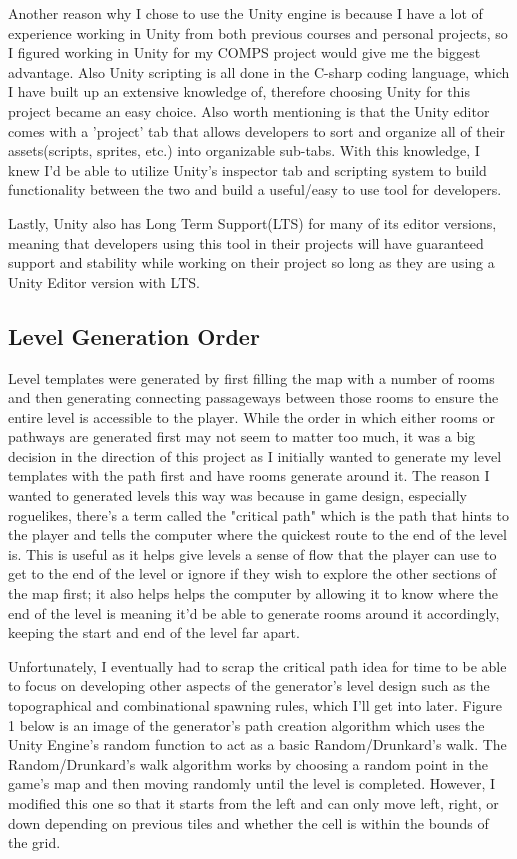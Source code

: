 \documentclass[10pt,twocolumn]{article}
\begin{document}
Another reason why I chose to use the Unity engine is because I have a lot of experience working in Unity from both previous courses and personal projects, so I figured working in Unity for my COMPS project would give me the biggest advantage. Also Unity scripting is all done in the C-sharp coding language, which I have built up an extensive knowledge of, therefore choosing Unity for this project became an easy choice. Also worth mentioning is that the Unity editor comes with a 'project' tab that allows developers to sort and organize all of their assets(scripts, sprites, etc.) into organizable sub-tabs. With this knowledge, I knew I'd be able to utilize Unity's inspector tab and scripting system to build functionality between the two and build a useful/easy to use tool for developers. 

Lastly, Unity also has Long Term Support(LTS) for many of its editor versions, meaning that developers using this tool in their projects will have guaranteed support and stability while working on their project so long as they are using a Unity Editor version with LTS. 

\subsection{Level Generation Order}

Level templates were generated by first filling the map with a number of rooms and then generating connecting passageways between those rooms to ensure the entire level is accessible to the player. While the order in which either rooms or pathways are generated first may not seem to matter too much, it was a big decision in the direction of this project as I initially wanted to generate my level templates with the path first and have rooms generate around it. The reason I wanted to generated levels this way was because in game design, especially roguelikes, there's a term called the "critical path" which is the path that hints to the player and tells the computer where the quickest route to the end of the level is\cite{castro2016level}. This is useful as it helps give levels a sense of flow that the player can use to get to the end of the level or ignore if they wish to explore the other sections of the map first; it also helps helps the computer by allowing it to know where the end of the level is meaning it'd be able to generate rooms around it accordingly, keeping the start and end of the level far apart. 

Unfortunately, I eventually had to scrap the critical path idea for time to be able to focus on developing other aspects of the generator's level design such as the topographical and combinational spawning rules, which I'll get into later. Figure 1 below is an image of the generator's path creation algorithm which uses the Unity Engine's random function to act as a basic Random/Drunkard's walk. The Random/Drunkard's walk algorithm works by choosing a random point in the game's map and then moving randomly until the level is completed\cite{koesnaedi2022implementation}. However, I modified this one so that it starts from the left and can only move left, right, or down depending on previous tiles and whether the cell is within the bounds of the grid. 
\end{document}
